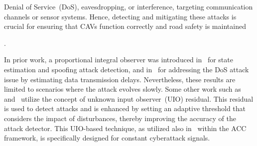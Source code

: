 Denial of Service~(DoS), eavesdropping, or interference, targeting communication channels or sensor systems. Hence, detecting and mitigating these attacks is crucial for ensuring that CAVs function correctly and road safety is maintained~{\cite{khalil2020fault,huang2022detection,mousavinejad2019distributed,SVD}.


{In prior work, a proportional integral observer was introduced in~\cite{simutal_PIO} for state estimation and spoofing attack detection, and in~\cite{DOS_attack_2023} for addressing the DoS attack issue by estimating data transmission delays. Nevertheless, these results are limited to scenarios where the attack evolves slowly}. {Some other work} such as~\cite{yamamoto2021attack} {and}~\cite{cheng2023adaptive} utilize the concept of unknown input observer~(UIO) residual. This residual is used to detect attacks and is enhanced by setting an adaptive threshold that considers the impact of disturbances, thereby improving the accuracy of the attack detector. {This UIO-based technique, as utilized also in~\cite{jeon2020simultaneous} within the ACC framework, is specifically designed for constant cyberattack signals. %
}

}
